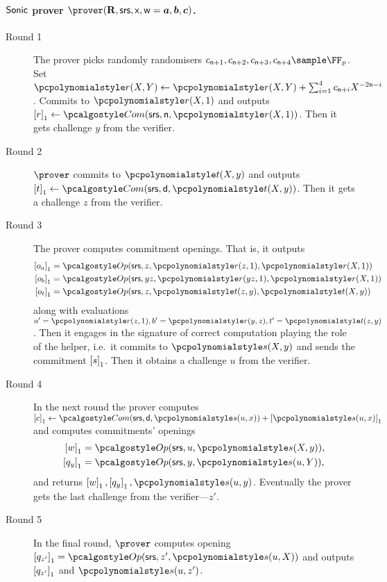 \documentclass[runningheads,11pt]{llncs}
\theoremstyle{definition} \newtheorem{definition}[theorem]{Definition}
\begin{document}
\paragraph{${\textnormal{\textsf{Sonic}}}$ prover $\prover(\REL, \srs, \inp, \wit=\va, \vb, \vc)$.}
\begin{description}
\item[Round 1] The prover picks randomly randomisers
  $c_{\multconstr + 1}, c_{\multconstr + 2}, c_{\multconstr + 3}, c_{\multconstr
    + 4} \sample \FF_p$. Set
  $\pr(X, Y) \gets \pr(X, Y) + \sum_{i = 1}^4 c_{\multconstr + i} X^{- 2
    \multconstr - i}$. Commits to $\pr(X, 1)$ and outputs
  $\gone{r} \gets \com(\srs, \multconstr, \pr(X, 1))$.  Then it gets challenge $y$ from
  the verifier.
\item[Round 2] $\prover$ commits to $\pt(X, y)$ and outputs
  $\gone{t} \gets \com(\srs, \dconst, \pt(X, y))$. Then it gets a challenge $z$ from
  the verifier.
\item[Round 3] The prover computes commitment openings. That is, it outputs
  \begin{align*}
    \gone{o_a} & = \open(\srs, z, \pr(z, 1), \pr(X, 1)) \\
    \gone{o_b} & = \open(\srs, yz, \pr(yz, 1), \pr(X, 1)) \\
    \gone{o_t} & = \open(\srs, z, \pt(z, y), \pt(X, y)) 
  \end{align*}
  along with evaluations $a' = \pr(z, 1), b' = \pr(y, z), t' = \pt(z, y)$.  Then it
  engages in the signature of correct computation playing the role of the
  helper, i.e.~it commits to $\p{s}(X, y)$ and sends the commitment $\left[s\right]_{1}$.  Then
  it obtains a challenge $u$ from the verifier.
\item[Round 4] In the next round the prover computes
  $\gone{c} \gets \com(\srs, \dconst, \p{s}(u, x)) + \gone{\p{s}(u, x)}$ and
  computes commitments' openings
  \begin{align*}
    \gone{w} & = \open(\srs, u, \p{s}(X, y)), \\
    \gone{q_y} & = \open(\srs, y, \p{s}(u, Y)),
  \end{align*}
  and returns $\gone{w}, \gone{q_y}, \p{s}(u, y)$. Eventually the prover gets the last challenge
  from the verifier---$z'$.
\item[Round 5] In the final round, $\prover$ computes opening
  $\gone{q_{z'}} = \open(\srs, z', \p{s}(u, X))$ and outputs $\left[q_{z'}\right]_{1}$ and $\p{s}(u, z')$.
\end{description}
\end{document}
